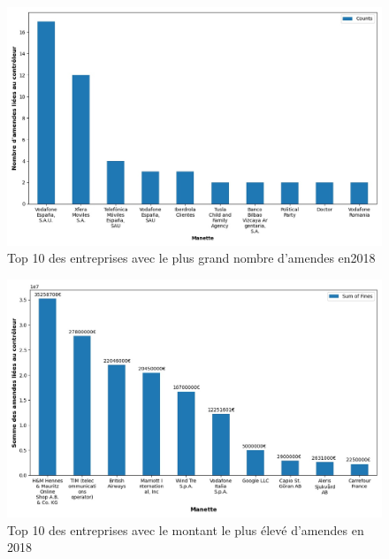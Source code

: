 \documentclass[french]{article}
\begin{document}
	
	\begin{multicols}{2}
	\begin{figure}
		[H]\centering\includegraphics[width=1.0\linewidth]{graphs/top10_controller_year}
		\caption{Top 10 des entreprises avec le plus grand nombre d'amendes en2018}
	\end{figure}
	\begin{figure}
		[H]\centering\includegraphics[width=1\linewidth]{graphs/top10_controller_year_fines}
		\caption{Top 10 des entreprises avec le montant le plus élevé d'amendes en 2018}
	 \end{figure}
	
	\end{multicols}
\end{document}
